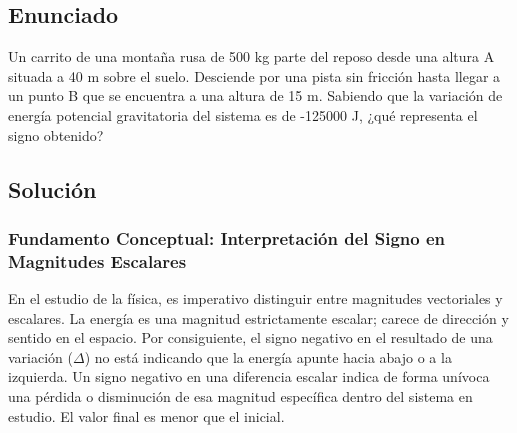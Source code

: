 \documentclass[12pt,a4paper]{article}
\begin{document}
\newpage
\subsection*{Enunciado}
Un carrito de una montaña rusa de 500 kg parte del reposo desde una altura A situada a 40 m sobre el suelo. Desciende por una pista sin fricción hasta llegar a un punto B que se encuentra a una altura de 15 m. Sabiendo que la variación de energía potencial gravitatoria del sistema es de -125000 J, ¿qué representa el signo obtenido?

\begin{center}
\end{center}

\subsection*{Solución}

\subsubsection*{Fundamento Conceptual: Interpretación del Signo en Magnitudes Escalares}
En el estudio de la física, es imperativo distinguir entre magnitudes vectoriales y escalares. La energía es una magnitud estrictamente escalar; carece de dirección y sentido en el espacio. Por consiguiente, el signo negativo en el resultado de una variación ($\Delta$) no está indicando que la energía apunte hacia abajo o a la izquierda. Un signo negativo en una diferencia escalar indica de forma unívoca una pérdida o disminución de esa magnitud específica dentro del sistema en estudio. El valor final es menor que el inicial.
\end{document}
